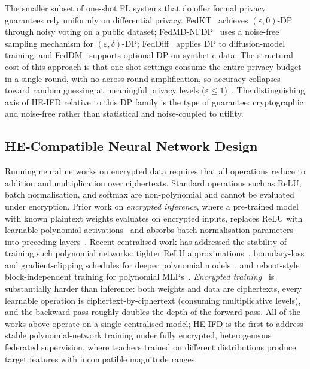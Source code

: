 The smaller subset of one-shot FL systems that do offer formal privacy guarantees rely uniformly on differential privacy. FedKT~\cite{li2021fedkt} achieves $(\varepsilon, 0)$-DP through noisy voting on a public dataset; FedMD-NFDP~\cite{sun2021fedmdnfdp} uses a noise-free sampling mechanism for $(\varepsilon, \delta)$-DP; FedDiff~\cite{feddiff2024} applies DP to diffusion-model training; and FedDM~\cite{xiong2023feddm} supports optional DP on synthetic data. The structural cost of this approach is that one-shot settings consume the entire privacy budget in a single round, with no across-round amplification, so accuracy collapses toward random guessing at meaningful privacy levels ($\varepsilon \leq 1$)~\cite{sun2021fedmdnfdp, gad2024communication}. The distinguishing axis of HE-IFD relative to this DP family is the type of guarantee: cryptographic and noise-free rather than statistical and noise-coupled to utility.


\subsection{HE-Compatible Neural Network Design}
\label{sec:bg_he_networks}

Running neural networks on encrypted data requires that all operations reduce to addition and multiplication over ciphertexts. Standard operations such as ReLU, batch normalisation, and softmax are non-polynomial and cannot be evaluated under encryption. Prior work on \emph{encrypted inference}, where a pre-trained model with known plaintext weights evaluates on encrypted inputs, replaces ReLU with learnable polynomial activations~\cite{baruch2022methodology, garimella2021sisyphus} and absorbs batch normalisation parameters into preceding layers~\cite{ibarrondo2021fhebn}. Recent centralised work has addressed the stability of training such polynomial networks: tighter ReLU approximations~\cite{agamennone2025polynomial}, boundary-loss and gradient-clipping schedules for deeper polynomial models~\cite{alhossain2025training}, and reboot-style block-independent training for polynomial MLPs~\cite{pirillo2025reboot}. \emph{Encrypted training}~\cite{sav2021poseidon} is substantially harder than inference: both weights and data are ciphertexts, every learnable operation is ciphertext-by-ciphertext (consuming multiplicative levels), and the backward pass roughly doubles the depth of the forward pass. All of the works above operate on a single centralised model; HE-IFD is the first to address stable polynomial-network training under fully encrypted, heterogeneous federated supervision, where teachers trained on different distributions produce target features with incompatible magnitude ranges.


